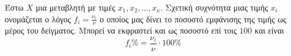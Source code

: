 Έστω $ X $ μια μεταβλητή με τιμές $ x_1,x_2,\ldots,x_{\kappa} $. Σχετική συχνότητα μιας τιμής $ x_i $ ονομάζεται ο λόγος $ f_i=\frac{\nu_i}{\nu} $ ο οποίος μας δίνει το ποσοστό εμφάνισης της τιμής ως μέρος του δείγματος. Μπορεί να εκφραστεί και ως ποσοστό επί τοις $ 100 $ και είναι \[ f_i\%=\frac{\nu_i}{\nu}\cdot 100\% \]

